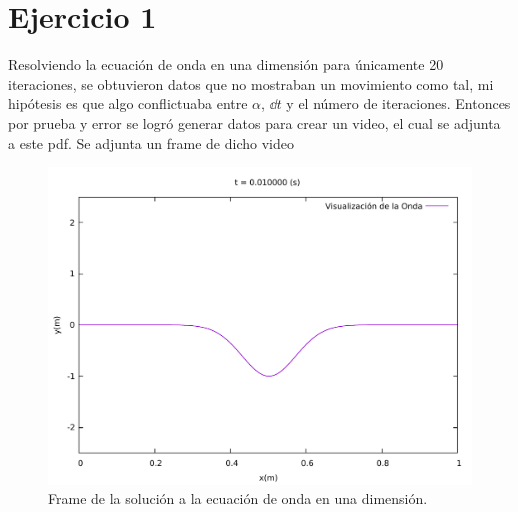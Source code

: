 \section*{Ejercicio 1}
Resolviendo la ecuación de onda en una dimensión para únicamente 20 iteraciones, se obtuvieron datos que no mostraban un movimiento como tal, mi hipótesis es que algo conflictuaba entre $\alpha$, $\dd{t}$ y el número de iteraciones. Entonces por prueba y error se logró generar datos para crear un video, el cual se adjunta a este pdf. Se adjunta un frame de dicho video

\begin{figure}[H]
	\centering
	\includegraphics[scale=0.5]{../img/ej7-1.pdf}
	\caption{Frame de la solución a la ecuación de onda en una dimensión.}
	\label{ej7-1}
\end{figure}

